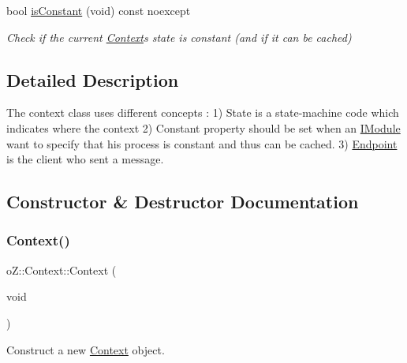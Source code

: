 \begin{DoxyCompactItemize}
bool \mbox{\hyperlink{classo_z_1_1_context_a748147258019436983fdbbf6ed51c0b6}{is\+Constant}} (void) const noexcept
\begin{DoxyCompactList}\small\item\em Check if the current \mbox{\hyperlink{classo_z_1_1_context}{Context}}\textquotesingle{}s state is constant (and if it can be cached) \end{DoxyCompactList}\end{DoxyCompactItemize}


\subsection{Detailed Description}
The context class uses different concepts \+: 1) State is a state-\/machine code which indicates where the context 2) Constant property should be set when an \mbox{\hyperlink{classo_z_1_1_i_module}{I\+Module}} want to specify that his process is constant and thus can be cached. 3) \mbox{\hyperlink{classo_z_1_1_endpoint}{Endpoint}} is the client who sent a message. 

\subsection{Constructor \& Destructor Documentation}
\mbox{\label{classo_z_1_1_context_af3aab1b32d4333320612049bdafb07d7}} 
\subsubsection{\texorpdfstring{Context()}{Context()}\hspace{0.1cm}{\footnotesize\ttfamily [1/4]}}
{\footnotesize\ttfamily o\+Z\+::\+Context\+::\+Context (\begin{DoxyParamCaption}\item[{void}]{ }\end{DoxyParamCaption})\hspace{0.3cm}{\ttfamily [default]}}



Construct a new \mbox{\hyperlink{classo_z_1_1_context}{Context}} object. 

\mbox{\label{classo_z_1_1_context_aa57df3d21eacc6e149f9c61c0c3f196b}} 
